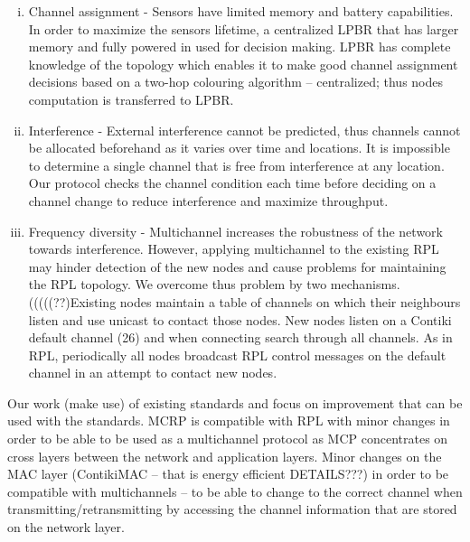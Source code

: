 \begin{enumerate}[i. ]
\item Channel assignment - Sensors have limited memory and battery capabilities. In order to maximize the sensors lifetime, a centralized LPBR that has larger memory and fully powered in used for decision making. LPBR has complete knowledge of the topology which enables it to make good channel assignment decisions based on a two-hop colouring algorithm – centralized; thus nodes computation is transferred to LPBR.

\item Interference - External interference cannot be predicted, thus channels cannot be allocated beforehand as it varies over time and locations. It is impossible to determine a single channel that is free from interference at any location. Our protocol checks the channel condition each time before deciding on a channel change to reduce interference and maximize throughput.

\item Frequency diversity - Multichannel increases the robustness of the network towards interference. However, applying multichannel to the existing RPL may hinder detection of the new nodes and cause problems for maintaining the RPL topology. We overcome thus problem by two mechanisms. (((((??)Existing nodes maintain a table of channels on which their neighbours listen and use unicast to contact those nodes. New nodes listen on a Contiki default channel (26) and when connecting search through all channels. As in RPL, periodically all nodes broadcast RPL control messages on the default channel in an attempt to contact new nodes.
\end{enumerate}

Our work (make use) of existing standards and focus on improvement that can be used with the standards. MCRP is compatible with RPL with minor changes in order to be able to be used as a multichannel protocol as MCP concentrates on cross layers between the network and application layers. Minor changes on the MAC layer (ContikiMAC – that is energy efficient DETAILS???) in order to be compatible with multichannels – to be able to change to the correct channel when transmitting/retransmitting by accessing the channel information that are stored on the network layer.

